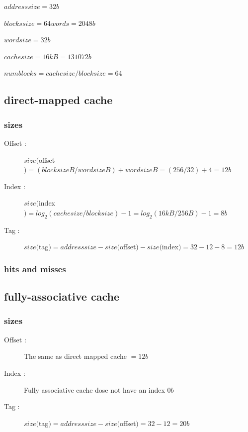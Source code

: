\documentclass[11pt]{article}
\begin{document}
    $addresssize = 32 b$

    $blockssize = 64 words = 2048 b$

    $wordsize = 32b$

    $cachesize =  16kB = 131072 b$
    
    $numblocks = cachesize/blocksize = 64$


    \subsection{direct-mapped cache}
		
      \subsubsection{sizes}
        \begin{description}
          \item[Offset : ] $size($offset$) = (blocksize B/wordsize B) + wordsize B = (256/32) + 4 = 12b$
          \item[Index : ] $size($index$) = log_2(cachesize/blocksize) - 1 = log_2(16kB/256B) - 1 = 8b$
          \item[Tag : ] $size($tag$) = addresssize- size($offset$) - size($index$) = 32 - 12 - 8 = 12b$
        \end{description}
        
      \subsubsection{hits and misses}

    \subsection{ fully-associative cache}
    
      \subsubsection{sizes}
        \begin{description}
          \item[Offset : ] The same as direct mapped cache $ = 12 b$
          \item[Index : ] Fully associative cache dose not have an index $0b$
          \item[Tag : ] $size($tag$) = addresssize- size($offset$) = 32 - 12 = 20b$
        \end{description}
        
\end{document}
